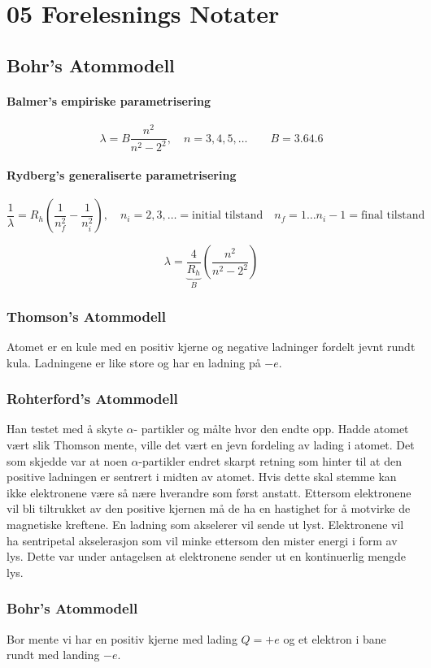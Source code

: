 \section{05 Forelesnings Notater}
\subsection{Bohr's Atommodell}
\paragraph*{Balmer's empiriske parametrisering}
\[
λ = B\frac{n^{2}}{n^2 - 2^2}, \quad n = 3, 4, 5, \dots \qquad B = 3.64.6
\]
\paragraph*{Rydberg's generaliserte parametrisering}
\[
\frac{1}{λ} = R_h \left( \frac{1}{n^{2}_{f}} - \frac{1}{n_i^{2}} \right), \quad n_i = 2, 3, \ldots = \text{initial tilstand} \quad n_f = 1 \ldots n_i - 1 = \text{final tilstand}
\]

\[
λ = \underbrace{\frac{4}{R_h}}_{B} \left( \frac{n^{2}}{n^{2} - 2^{2}} \right) 
\]
\subsubsection{Thomson's Atommodell}
Atomet er en kule med en positiv kjerne og negative ladninger fordelt jevnt rundt kula. Ladningene er like store og har en ladning på $-e$.

\subsubsection{Rohterford's Atommodell}

Han testet med å skyte $α$- partikler og målte hvor den endte opp. Hadde atomet vært slik Thomson mente, ville det vært en jevn fordeling av lading i atomet. Det som skjedde var at noen $α$-partikler endret skarpt retning som hinter til at den positive ladningen er sentrert i midten av atomet. Hvis dette skal stemme kan ikke elektronene være så nære hverandre som først anstatt. Ettersom elektronene vil bli tiltrukket av den positive kjernen må de ha en hastighet for å motvirke de magnetiske kreftene. En ladning som akselerer vil sende ut lyst. Elektronene vil ha sentripetal akselerasjon som vil minke ettersom den mister energi i form av lys. Dette var under antagelsen at elektronene sender ut en kontinuerlig mengde lys. 

\subsubsection{Bohr's Atommodell}
Bor mente vi har en positiv kjerne med lading $Q = +e$ og et elektron i bane rundt med landing $-e$. 

